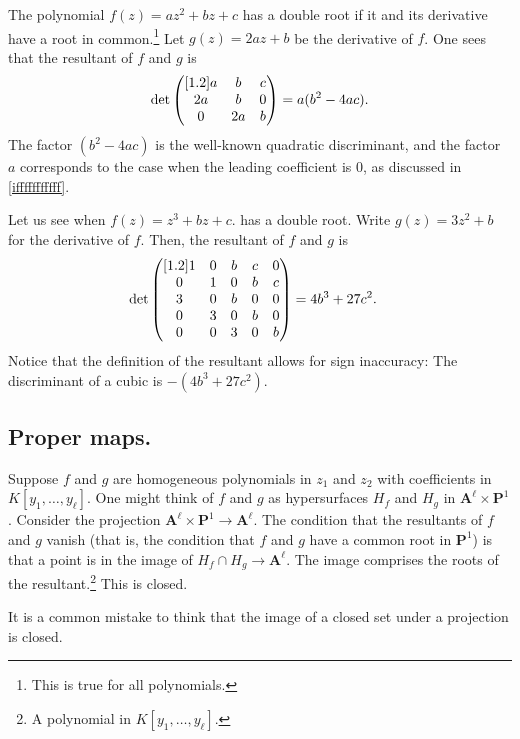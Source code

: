 \documentclass [11 pt, oneside] {article}
\begin{document}
\begin{example}[ ]\label{}\text{}
The polynomial $f(z)=az^2+bz+c$ has a double root if it and its derivative have a root in common.\footnote{This is true for all polynomials.} Let $g(z)=2az+b$ be the derivative of $f$. One sees that the resultant of $f$ and $g$ is
\begin{align*}
	\det\begin{pmatrix} [1.2] a&b&c\\2a&b&0\\0&2a&b\end{pmatrix} = a(b^2-4ac).
\end{align*}
The factor $(b^2-4ac)$ is the well-known quadratic discriminant, and the factor $a$ corresponds to the case when the leading coefficient is $0$, as discussed in \cref{ifffffffffff}.  
\end{example}

\begin{example}[ ]\label{}\text{}
Let us see when $f(z)=z^3+bz+c$. has a double root. Write $g (z)= 3z^2 + b$ for the derivative of $f$. Then, the resultant of $f$ and $g$ is
\begin{align*}
	\det\begin{pmatrix} [1.2] 1&0&b&c&0\\0&1&0&b&c\\3&0&b&0&0\\0&3&0&b&0\\0&0&3&0&b\end{pmatrix}&= 4b^3+27c^2.
\end{align*}
Notice that the definition of the resultant allows for sign inaccuracy: The discriminant of a cubic is $-(4b^3+27c^2)$.
\end{example}

\subsection{Proper maps.}
Suppose $f$ and $g$ are homogeneous polynomials in $z_1$ and $z_2$ with coefficients in $K[y_1,\hdots, y_\ell]$. One might think of $f$ and $g$ as hypersurfaces $H_f$ and $H_g$ in $\mathbf{A}^\ell\times \mathbf{P}^1$. Consider the projection $\mathbf{A}^\ell\times \mathbf{P}^1\longrightarrow \mathbf{A}^\ell$. The condition that the resultants of $f$ and $g$ vanish (that is, the condition that $f$ and $g$ have a common root in $\mathbf{P}^1$) is that a point is in the image of $H_f\cap H_g\longrightarrow \mathbf{A}^\ell$. The image comprises the roots of the resultant.\footnote{A polynomial in $K[y_1,\hdots,y_\ell]$.} This is closed.

\begin{remark}
	It is a common mistake to think that the image of a closed set under a projection is closed.
\end{remark}
\end{document}

